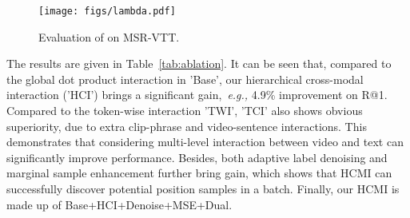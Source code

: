 \documentclass{article}
\begin{document}
\begin{table*}[t]
\centering
    \caption{Retrieval results on MSVD. * indicates that the method uses post-processing operations, ~\emph{e.g.,} DSL \cite{cheng2021improving} or QB-Norm \cite{bogolin2021cross}.}
    \label{tab:msvd}
    \vspace{-0.2cm}
\end{table*}

\begin{figure}[h]
    \centering
    \texttt{[image: figs/lambda.pdf]}
    \caption{Evaluation of  on MSR-VTT.}
    \label{fig:lambda}
\end{figure}


The results are given in Table~\ref{tab:ablation}.
It can be seen that, compared to the global dot product interaction in 'Base', our hierarchical cross-modal interaction ('HCI') brings a significant gain,~\emph{e.g.,} 4.9\% improvement on R@1.
Compared to the token-wise interaction 'TWI', 'TCI' also shows obvious superiority, due to extra clip-phrase and video-sentence interactions.
This demonstrates that considering multi-level interaction between video and text can significantly improve performance.
Besides, both adaptive label denoising and marginal sample enhancement further bring gain, which shows that HCMI can successfully discover potential position samples in a batch.
Finally, our HCMI is made up of Base+HCI+Denoise+MSE+Dual.
\end{document}
